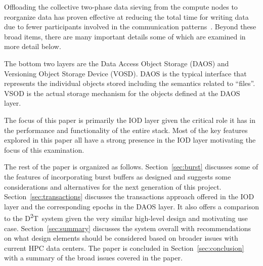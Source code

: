 \documentclass[conference]{sig-alt-gov2}
\newcommand{\DDT}{D\textsuperscript{2}T~}
\begin{document}
Offloading the collective two-phase data sieving from the compute nodes to
reorganize data has proven effective at reducing the total time for writing
data due to fewer participants involved in the communication
patterns~\cite{lofstead:2011:nessie-staging}.  Beyond these broad items, there
are many important details some of which are examined in more detail below.

The bottom two layers are the Data Access Object Storage (DAOS) and Versioning
Object Storage Device (VOSD). DAOS is the typical interface that represents
the individual objects stored including the semantics related to ``files''.
VSOD is the actual storage mechanism for the objects defined at the DAOS layer.

The focus of this paper is primarily the IOD layer given the critical role it
has in the performance and functionality of the entire stack. Most of the key
features explored in this paper all have a strong presence in the IOD layer
motivating the focus of this examination.



The rest of the paper is organized as follows. Section~\ref{sec:burst}
discusses some of the features of incorporating burst buffers as designed and
suggests some considerations and alternatives for the next generation of this
project. Section~\ref{sec:transactions} discusses the transactions approach
offered in the IOD layer and the corresponding epochs in the DAOS layer. It
also offers a comparison to the \DDT system given the very similar high-level
design and motivating use case.  Section~\ref{sec:summary} discusses the system
overall with recommendations on what design elements should be considered based
on broader issues with current HPC data centers. The paper is concluded in
Section~\ref{sec:conclusion} with a summary of the broad issues covered in the
paper.
\end{document}
